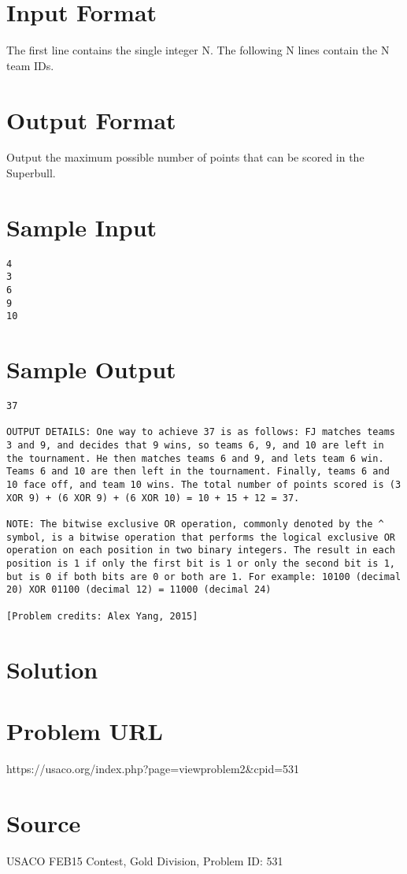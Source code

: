 \documentclass[12pt]{article}
\begin{document}
\section*{Input Format}
The first line contains the single integer N.  The following N lines contain the N team IDs.

\section*{Output Format}
Output the maximum possible number of points that can be scored in the Superbull.

\section*{Sample Input}
\begin{verbatim}
4
3
6
9
10
\end{verbatim}

\section*{Sample Output}
\begin{verbatim}
37

OUTPUT DETAILS: One way to achieve 37 is as follows: FJ matches teams 3 and 9, and decides that 9 wins, so teams 6, 9, and 10 are left in the tournament. He then matches teams 6 and 9, and lets team 6 win. Teams 6 and 10 are then left in the tournament. Finally, teams 6 and 10 face off, and team 10 wins. The total number of points scored is (3 XOR 9) + (6 XOR 9) + (6 XOR 10) = 10 + 15 + 12 = 37.

NOTE: The bitwise exclusive OR operation, commonly denoted by the ^ symbol, is a bitwise operation that performs the logical exclusive OR operation on each position in two binary integers. The result in each position is 1 if only the first bit is 1 or only the second bit is 1, but is 0 if both bits are 0 or both are 1. For example: 10100 (decimal 20) XOR 01100 (decimal 12) = 11000 (decimal 24)

[Problem credits: Alex Yang, 2015]
\end{verbatim}

\section*{Solution}


\section*{Problem URL}
https://usaco.org/index.php?page=viewproblem2&cpid=531

\section*{Source}
USACO FEB15 Contest, Gold Division, Problem ID: 531
\end{document}
